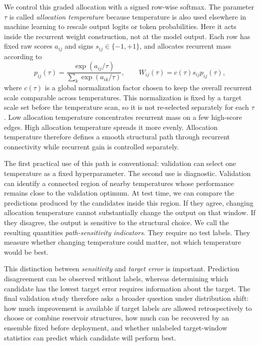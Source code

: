 \documentclass[preprint,12pt,authoryear]{elsarticle}
\begin{document}
We control this graded allocation with a signed row-wise softmax. The parameter $\tau$ is called \emph{allocation temperature} because temperature is also used elsewhere in machine learning to rescale output logits or token probabilities. Here it acts inside the recurrent weight construction, not at the model output. Each row has fixed raw scores $a_{ij}$ and signs $s_{ij}\in\{-1,+1\}$, and allocates recurrent mass according to
\begin{equation}
  p_{ij}(\tau)=\frac{\exp(a_{ij}/\tau)}{\sum_k \exp(a_{ik}/\tau)},
  \qquad
  W_{ij}(\tau)=c(\tau) s_{ij} p_{ij}(\tau),
\end{equation}
where $c(\tau)$ is a global normalization factor chosen to keep the overall recurrent scale comparable across temperatures. This normalization is fixed by a target scale set before the temperature scan, so it is not re-selected separately for each $\tau$. Low allocation temperature concentrates recurrent mass on a few high-score edges. High allocation temperature spreads it more evenly. Allocation temperature therefore defines a smooth structural path through recurrent connectivity while recurrent gain is controlled separately.

The first practical use of this path is conventional: validation can select one temperature as a fixed hyperparameter. The second use is diagnostic. Validation can identify a connected region of nearby temperatures whose performance remains close to the validation optimum. At test time, we can compare the predictions produced by the candidates inside this region. If they agree, changing allocation temperature cannot substantially change the output on that window. If they disagree, the output is sensitive to the structural choice. We call the resulting quantities \emph{path-sensitivity indicators}. They require no test labels. They measure whether changing temperature could matter, not which temperature would be best.

This distinction between \emph{sensitivity} and \emph{target error} is important. Prediction disagreement can be observed without labels, whereas determining which candidate has the lowest target error requires information about the target. The final validation study therefore asks a broader question under distribution shift: how much improvement is available if target labels are allowed retrospectively to choose or combine reservoir structures, how much can be recovered by an ensemble fixed before deployment, and whether unlabeled target-window statistics can predict which candidate will perform best.
\end{document}
